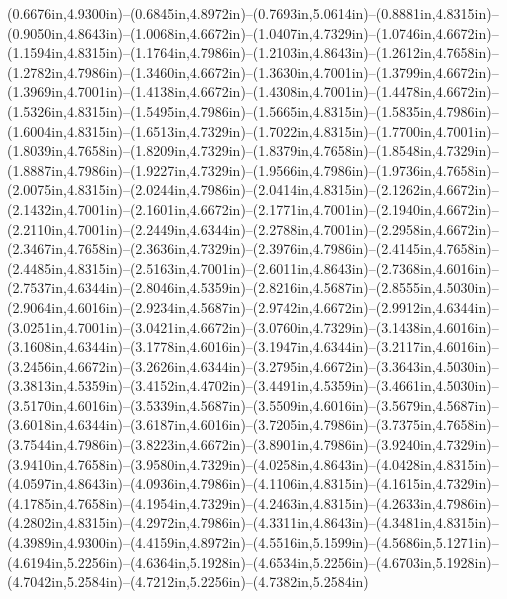 (0.6676in,4.9300in)--(0.6845in,4.8972in)--(0.7693in,5.0614in)--(0.8881in,4.8315in)--(0.9050in,4.8643in)--(1.0068in,4.6672in)--(1.0407in,4.7329in)--(1.0746in,4.6672in)--(1.1594in,4.8315in)--(1.1764in,4.7986in)--(1.2103in,4.8643in)--(1.2612in,4.7658in)--(1.2782in,4.7986in)--(1.3460in,4.6672in)--(1.3630in,4.7001in)--(1.3799in,4.6672in)--(1.3969in,4.7001in)--(1.4138in,4.6672in)--(1.4308in,4.7001in)--(1.4478in,4.6672in)--(1.5326in,4.8315in)--(1.5495in,4.7986in)--(1.5665in,4.8315in)--(1.5835in,4.7986in)--(1.6004in,4.8315in)--(1.6513in,4.7329in)--(1.7022in,4.8315in)--(1.7700in,4.7001in)--(1.8039in,4.7658in)--(1.8209in,4.7329in)--(1.8379in,4.7658in)--(1.8548in,4.7329in)--(1.8887in,4.7986in)--(1.9227in,4.7329in)--(1.9566in,4.7986in)--(1.9736in,4.7658in)--(2.0075in,4.8315in)--(2.0244in,4.7986in)--(2.0414in,4.8315in)--(2.1262in,4.6672in)--(2.1432in,4.7001in)--(2.1601in,4.6672in)--(2.1771in,4.7001in)--(2.1940in,4.6672in)--(2.2110in,4.7001in)--(2.2449in,4.6344in)--(2.2788in,4.7001in)--(2.2958in,4.6672in)--(2.3467in,4.7658in)--(2.3636in,4.7329in)--(2.3976in,4.7986in)--(2.4145in,4.7658in)--(2.4485in,4.8315in)--(2.5163in,4.7001in)--(2.6011in,4.8643in)--(2.7368in,4.6016in)--(2.7537in,4.6344in)--(2.8046in,4.5359in)--(2.8216in,4.5687in)--(2.8555in,4.5030in)--(2.9064in,4.6016in)--(2.9234in,4.5687in)--(2.9742in,4.6672in)--(2.9912in,4.6344in)--(3.0251in,4.7001in)--(3.0421in,4.6672in)--(3.0760in,4.7329in)--(3.1438in,4.6016in)--(3.1608in,4.6344in)--(3.1778in,4.6016in)--(3.1947in,4.6344in)--(3.2117in,4.6016in)--(3.2456in,4.6672in)--(3.2626in,4.6344in)--(3.2795in,4.6672in)--(3.3643in,4.5030in)--(3.3813in,4.5359in)--(3.4152in,4.4702in)--(3.4491in,4.5359in)--(3.4661in,4.5030in)--(3.5170in,4.6016in)--(3.5339in,4.5687in)--(3.5509in,4.6016in)--(3.5679in,4.5687in)--(3.6018in,4.6344in)--(3.6187in,4.6016in)--(3.7205in,4.7986in)--(3.7375in,4.7658in)--(3.7544in,4.7986in)--(3.8223in,4.6672in)--(3.8901in,4.7986in)--(3.9240in,4.7329in)--(3.9410in,4.7658in)--(3.9580in,4.7329in)--(4.0258in,4.8643in)--(4.0428in,4.8315in)--(4.0597in,4.8643in)--(4.0936in,4.7986in)--(4.1106in,4.8315in)--(4.1615in,4.7329in)--(4.1785in,4.7658in)--(4.1954in,4.7329in)--(4.2463in,4.8315in)--(4.2633in,4.7986in)--(4.2802in,4.8315in)--(4.2972in,4.7986in)--(4.3311in,4.8643in)--(4.3481in,4.8315in)--(4.3989in,4.9300in)--(4.4159in,4.8972in)--(4.5516in,5.1599in)--(4.5686in,5.1271in)--(4.6194in,5.2256in)--(4.6364in,5.1928in)--(4.6534in,5.2256in)--(4.6703in,5.1928in)--(4.7042in,5.2584in)--(4.7212in,5.2256in)--(4.7382in,5.2584in) 